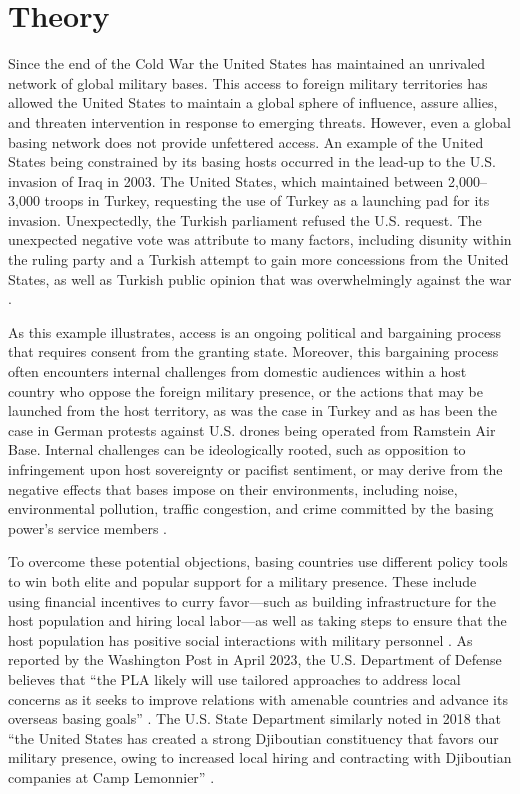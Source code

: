 \section*{Theory}

Since the end of the Cold War the United States has maintained an unrivaled network of global military bases. This access to foreign military territories has allowed the United States to maintain a global sphere of influence, assure allies, and threaten intervention in response to emerging threats. However, even a global basing network does not provide unfettered access. An example of the United States being constrained by its basing hosts occurred in the lead-up to the U.S. invasion of Iraq in 2003. The United States, which maintained between 2,000–3,000 troops in Turkey, requesting the use of Turkey as a launching pad for its invasion. Unexpectedly, the Turkish parliament refused the U.S. request. The unexpected negative vote was attribute to many factors, including disunity within the ruling party and a Turkish attempt to gain more concessions from the United States, as well as Turkish public opinion that was overwhelmingly against the war \cite{otterman2005}. 

As this example illustrates, access is an ongoing political and bargaining process that requires consent from the granting state. Moreover, this bargaining process often encounters internal challenges from domestic audiences within a host country who oppose the foreign military presence, or the actions that may be launched from the host territory, as was the case in Turkey and as has been the case in German protests against U.S. drones being operated from Ramstein Air Base. Internal challenges can be ideologically rooted, such as opposition to infringement upon host sovereignty or pacifist sentiment, or may derive from the negative effects that bases impose on their environments, including noise, environmental pollution, traffic congestion, and crime committed by the basing power's service members \cite{kim2023}.

To overcome these potential objections, basing countries use different policy tools to win both elite and popular support for a military presence. These include using financial incentives to curry favor---such as building infrastructure for the host population and hiring local labor—as well as taking steps to ensure that the host population has positive social interactions with military personnel \cite{allen2020,blankenship2020,allen2023}. As reported by the Washington Post in April 2023, the U.S. Department of Defense believes that ``the PLA likely will use tailored approaches to address local concerns as it seeks to improve relations with amenable countries and advance its overseas basing goals'' \cite{hudson2023}. The U.S. State Department similarly noted in 2018 that ``the United States has created a strong Djiboutian constituency that favors our military presence, owing to increased local hiring and contracting with Djiboutian companies at Camp Lemonnier'' \cite{state2018}. 

